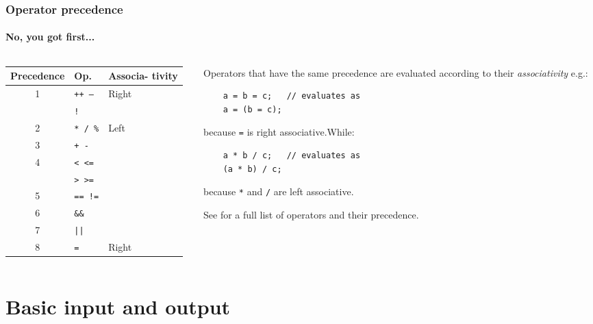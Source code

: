 \documentclass{beamer}
\begin{document}
\begin{frame}[fragile]
  \frametitle{Operator precedence}
  \framesubtitle{No, you got first...}
  \begin{columns}[t]
	  \begin{column}[T]{0.44\textwidth}
		  \begin{tabular}{c|l|m{1.2cm}}
			  Precedence & Op. & Associa-
			  tivity \\
			  \hline
			  \multirow{2}{*}{1} & \texttt{++ --} & \multirow{2}{*}{Right}\\
			    & \texttt{!} \\
			  \hline
			  2 & \texttt{* / \%} & \multirow{6}{*}{Left} \\
			  \cline{1-2}
			  3 & \texttt{+ -} & \\
			  \cline{1-2}
			  \multirow{2}{*}{4} & \texttt{< <=} \\
			    & \texttt{> >=} \\
			  \cline{1-2}
			  5 & \texttt{== !=} \\
			  \cline{1-2}
			  6 & \texttt{\&\&} \\
			  \cline{1-2}
			  7 & \texttt{||} \\
			  \hline
			  8 & \texttt{=} & Right
		  \end{tabular}
	 	\end{column}
	  \begin{column}[T]{0.518\textwidth}
	    Operators that have the same precedence are evaluated according to their \textit{associativity} e.g.:
	    \begin{lstlisting}
	a = b = c;   // evaluates as
	a = (b = c);
	    \end{lstlisting}
			because \texttt{=} is right associative.\pause  While:
	    \begin{lstlisting}
	a * b / c;   // evaluates as
	(a * b) / c;
	    \end{lstlisting}
	because \texttt{*} and \texttt{/} are left associative. 
	    
	  	See\footnotemark{} for a full list of operators and their precedence.
	  \end{column}
	\end{columns}
\end{frame}


\section{Basic input and output}
\end{document}
